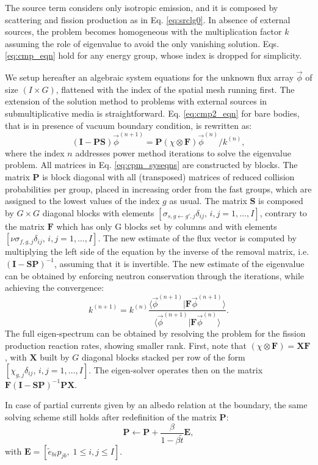 \documentclass{ictt26}
\begin{document}
The source term considers only isotropic emission, and it is composed by scattering and fission production as in Eq. \ref{eq:srclg0}. In absence of external sources, the problem becomes homogeneous with the multiplication factor $k$ assuming the role of eigenvalue to avoid the only vanishing solution. Eqs. \ref{eq:cmp_eqn} hold for any energy group, whose index is dropped for simplicity.

We setup hereafter an algebraic system equations for the unknown flux array $\vec{\phi}$ of size $(I \times G)$, flattened with the index of the spatial mesh running first. The extension of the solution method to problems with external sources in submultiplicative media is straightforward. Eq. \ref{eq:cmp2_eqn} for bare bodies, that is in presence of vacuum boundary condition, is rewritten as:
\begin{equation}
\label{eq:cpm_syseqns}
(\mathbf{I} - \mathbf{P}\mathbf{S}) \vec{\phi}^{(n+1)} = \mathbf{P} (\chi \otimes \mathbf{F}) \vec{\phi}^{(n)} / k^{(n)},
\end{equation}
where the index $n$ addresses power method iterations to solve the eigenvalue problem. All matrices in Eq. \ref{eq:cpm_syseqns} are constructed by blocks. The matrix $\mathbf{P}$ is block diagonal with all (transposed) matrices of reduced collision probabilities per group, placed in increasing order from the fast groups, which are assigned to the lowest values of the index $g$ as usual. The matrix $\mathbf{S}$ is composed by $G \times G$ diagonal blocks with elements $[\sigma_{s, g \leftarrow g',j}\delta_{ij}, \, i, j=1, \ldots, I]$, contrary to the matrix $\mathbf{F}$ which has only G blocks set by columns and with elements $[\nu\sigma_{f, g, j}\delta_{ij}, \, i, j=1, \ldots, I]$. The new estimate of the flux vector is computed by multiplying the left side of the equation by the inverse of the removal matrix, i.e. $(\mathbf{I} - \mathbf{S} \mathbf{P})^{-1}$, assuming that it is invertible. The new estimate of the eigenvalue can be obtained by enforcing neutron conservation through the iterations, while achieving the convergence:
\[
  k^{(n+1)} = k^{(n)}
    \frac{\langle \vec{\phi}^{(n+1)} | \mathbf{F} \vec{\phi}^{(n+1)} \rangle}{\langle \vec{\phi}^{(n+1)} | \mathbf{F} \vec{\phi}^{(n)} \rangle}.
\]
The full eigen-spectrum can be obtained by resolving the problem for the fission production reaction rates, showing smaller rank. First, note that $(\chi \otimes \mathbf{F}) = \mathbf{X} \mathbf{F}$, with $\mathbf{X}$ built by $G$ diagonal blocks stacked per row of the form $[\chi_{g,j}\delta_{ij}, \, i, j=1, \ldots, I]$. The eigen-solver operates then on the matrix $\mathbf{F}(\mathbf{I} - \mathbf{S} \mathbf{P})^{-1} \mathbf{P} \mathbf{X}$.

In case of partial currents given by an albedo relation at the boundary, the same solving scheme still holds after redefinition of the matrix $\mathbf{P}$:
\[
\mathbf{P} \leftarrow \mathbf{P} + \frac{\beta}{1 - \beta \tilde{t}} \mathbf{E},
\]
with $\mathbf{E}=[\tilde{e}_{bi} p_{jb},\; 1 \leq i,j \leq I]$.

\setlength{\baselineskip}{12pt}


\end{document}
